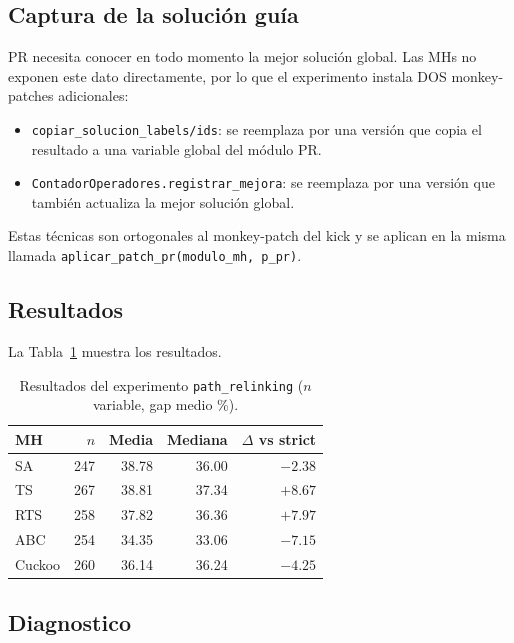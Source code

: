 \documentclass[11pt,a4paper]{article}
\theoremstyle{definition}
\theoremstyle{remark}
\begin{document}
\subsection{Captura de la solución guía}

PR necesita conocer en todo momento la mejor solución global. Las MHs
no exponen este dato directamente, por lo que el experimento instala
DOS monkey-patches adicionales:

\begin{itemize}
\item \texttt{copiar\_solucion\_labels/ids}: se reemplaza por una
  versión que copia el resultado a una variable global del módulo PR.
\item \texttt{ContadorOperadores.registrar\_mejora}: se reemplaza por
  una versión que también actualiza la mejor solución global.
\end{itemize}

Estas técnicas son ortogonales al monkey-patch del kick y se aplican en
la misma llamada \texttt{aplicar\_patch\_pr(modulo\_mh, p\_pr)}.

\subsection{Resultados}

La Tabla~\ref{tab:pr-resultados} muestra los resultados.

\begin{table}[h]
\centering
\caption{Resultados del experimento \texttt{path\_relinking}
($n$ variable, gap medio \%).}
\label{tab:pr-resultados}
\small
\begin{tabular}{lrrrr}
\toprule
MH & $n$ & Media & Mediana & $\Delta$ vs strict \\
\midrule
SA      & 247 & 38.78 & 36.00 & $-2.38$ \\
TS      & 267 & 38.81 & 37.34 & $+8.67$ \\
RTS     & 258 & 37.82 & 36.36 & $+7.97$ \\
ABC     & 254 & 34.35 & 33.06 & $-7.15$ \\
Cuckoo  & 260 & 36.14 & 36.24 & $-4.25$ \\
\bottomrule
\end{tabular}
\end{table}

\subsection{Diagnostico}
\end{document}
